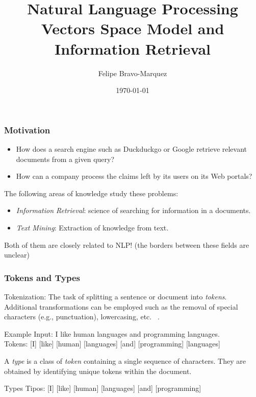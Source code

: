 \documentclass[handout]{beamer}
\title{Natural Language Processing \\ Vectors Space Model and Information Retrieval}
\author[Felipe Bravo Márquez]{\footnotesize
 \textcolor[rgb]{0.00,0.00,1.00}{Felipe Bravo-Marquez}}
\date{\today}
\begin{document}
\begin{frame}
\titlepage


\end{frame}

\begin{frame}\frametitle{Motivation}


  \begin{itemize}
   \item How does a search engine such as Duckduckgo or Google retrieve relevant documents from a given query?
   \item How can a company process the claims left by its users on its Web portals?
  \end{itemize}

The following areas of knowledge study these problems:

\begin{itemize}
 \item \emph{Information Retrieval}:  science of searching for information in a documents.
 \item \emph{Text Mining}: Extraction of knowledge from text.
\end{itemize}

Both of them are closely related to NLP! (the borders between these fields are unclear)

\end{frame}

\begin{frame}\frametitle{Tokens and Types}
{\footnotesize
Tokenization: The task of splitting a sentence or document into \emph{tokens}. \\
Additional transformations can be employed such as the removal of special characters (e.g., punctuation), lowercasing, etc. ~\cite{manning2008}. 

\begin{block}{Example}
Input: I like human languages and programming languages.\\
Tokens: [I] [like] [human] [languages] [and] [programming] [languages]
\end{block}

A \emph{type} is a class of \emph{token} containing a single sequence of characters.
They are obtained by identifying unique tokens within the document.

\begin{block}{Types}
Tipos: [I] [like] [human] [languages] [and] [programming]  \\
\end{block}



 }
\end{frame}
\end{document}
